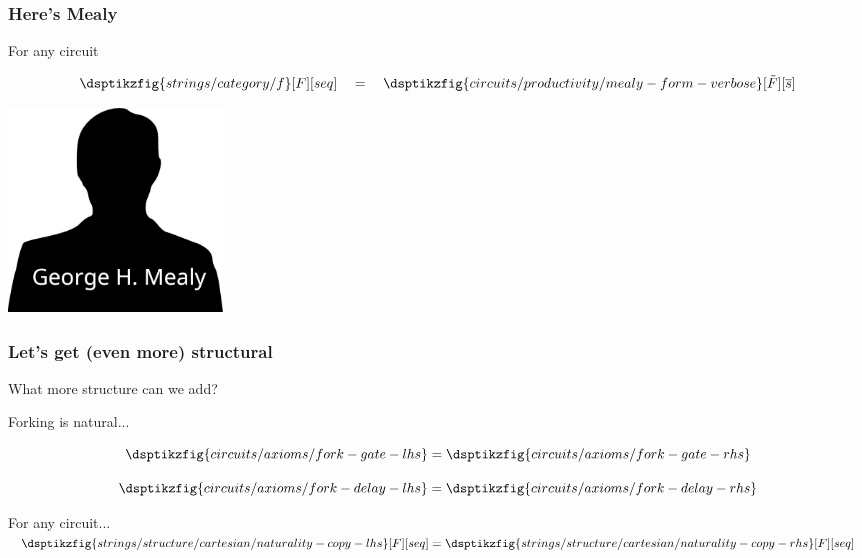 \begin{frame}
    \frametitle{Here's Mealy}

    \centering
    For \alert{any} circuit

    \[
        \dsptikzfig{strings/category/f}[F][seq]
        \quad
        =
        \quad
        \dsptikzfig{circuits/productivity/mealy-form-verbose}[\tilde{F}][\overline{s}]
    \]

    \pause

    \includegraphics[width=0.25\textwidth]{imgs/mealy}

\end{frame}
\begin{frame}
    \frametitle{Let's get (even more) structural}

    What more structure can we add?

    \pause

    \alert{Forking} is natural...

    \pause

    \begin{axiom}
        \begin{minipage}{0.33\textwidth}
            \begin{equation*}
                \dsptikzfig{circuits/axioms/fork-gate-lhs}
                =
                \dsptikzfig{circuits/axioms/fork-gate-rhs}
            \end{equation*}
        \end{minipage}
        \begin{minipage}{0.33\textwidth}
            \begin{equation*}
                \dsptikzfig{circuits/axioms/fork-delay-lhs}
                =
                \dsptikzfig{circuits/axioms/fork-delay-rhs}
            \end{equation*}
        \end{minipage}
    \end{axiom}

    For any circuit...
    \(
        \dsptikzfig{strings/structure/cartesian/naturality-copy-lhs}[F][seq]
        =
        \dsptikzfig{strings/structure/cartesian/naturality-copy-rhs}[F][seq]
    \)
\end{frame}
